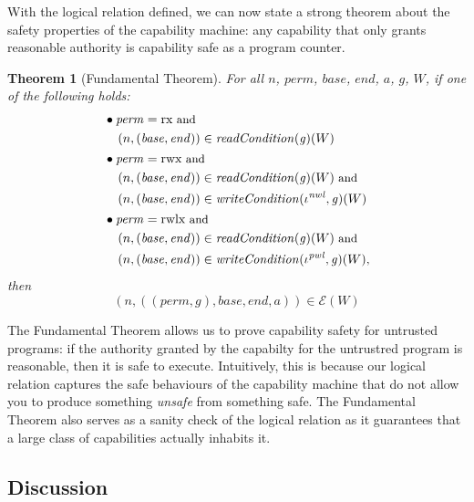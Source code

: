 \documentclass[compsoc,conference,letterpaper,fleqn]{IEEEtran}
\newtheorem{theorem}{Theorem}
\newcommand{\var}[1]{\mathit{#1}}
\newcommand{\gl}{\var{g}}
\newcommand{\addr}{\var{a}}
\newcommand{\start}{\var{base}}
\newcommand{\addrend}{\var{end}}
\newcommand{\perm}{\var{perm}}
\newcommand{\nwl}{\var{nwl}}
\newcommand{\pwl}{\var{pwl}}
\newcommand{\plainfun}[2]{
  \ifthenelse{\equal{#2}{}}
  {\mathit{#1}}
  {\mathit{#1}(#2)}
}
\newcommand{\readCond}[1]{\plainfun{readCondition}{#1}}
\newcommand{\writeCond}[1]{\plainfun{writeCondition}{#1}}
\newcommand{\asmType}{\plaindom{AsmType}}
\newcommand{\plaindom}[1]{\mathrm{#1}}
\newcommand{\intr}[2]{\mathcal{#1}}
\newcommand{\exprintr}[1]{\intr{E}{#1}}
\newcommand{\stder}{\exprintr{\asmType}}
\newcommand{\npair}[2][n]{\left(#1,#2 \right)}
\newcommand{\plainperm}[1]{\mathrm{#1}}
\newcommand{\exec}{\plainperm{rx}}
\newcommand{\rwx}{\plainperm{rwx}}
\newcommand{\rwlx}{\plainperm{rwlx}}
\begin{document}
With the logical relation defined, we can now state a strong theorem
about the safety properties of the capability machine:
any capability that only grants reasonable authority is capability
safe as a program counter.
\begin{theorem}[Fundamental Theorem]
  \label{thm:ftlr}
  For all $n$, $\perm$, $\start$, $\addrend$, $\addr$, $\gl$, $W$, if one of the following holds:
  \begin{align*}
      & \bullet
        \begin{aligned}[t]
        &\perm = \exec \text{\footnotesize{ and }}\\
        &\npair{(\start,\addrend)} \in \readCond{}(\gl)(W)
      \end{aligned} \\
    & \bullet 
      \begin{aligned}[t]
        &\perm = \rwx \text{\footnotesize{ and }} \\
        &\npair{(\start,\addrend)} \in \readCond{}(\gl)(W) \text{\footnotesize{ and }}\\
        &\npair{(\start,\addrend)} \in \writeCond{}(\iota^\nwl,\gl)(W)
      \end{aligned} \\
    & \bullet 
      \begin{aligned}[t]
        &\perm = \rwlx \text{\footnotesize{ and }}\\
        &\npair{(\start,\addrend)} \in \readCond{}(\gl)(W) \text{\footnotesize{ and }}\\
        &\npair{(\start,\addrend)} \in \writeCond{}(\iota^\pwl,\gl)(W),
      \end{aligned}
  \end{align*}
  then
  \[
    \npair{((\perm,\gl),\start,\addrend,\addr)} \in \stder(W)
  \]
\end{theorem}
The Fundamental Theorem allows us to prove capability safety for
untrusted programs: if the authority granted by
the capabilty for the untrustred program is reasonable, then it is safe to
execute. Intuitively, this is because our logical relation captures the
safe behaviours of the capability machine that do not allow you to
produce something \emph{unsafe} from something safe. 
The Fundamental Theorem also serves as a sanity check of the
logical relation as it guarantees that a large class of capabilities
actually inhabits it.

\subsection{Discussion}
\end{document}
